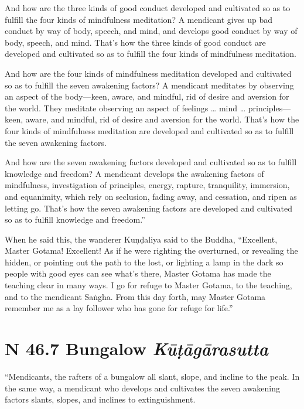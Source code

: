 \documentclass[12pt,openany]{book}%
\newcommand*{\suttatitleacronym}[1]{\smaller[2]{#1}\vspace*{.3em}}
\newcommand*{\suttatitletranslation}[1]{\linebreak{#1}}
\newcommand*{\suttatitleroot}[1]{\linebreak\smaller[2]\itshape{#1}}
\newcommand*{\tocacronym}[1]{\hspace*{-3.3em}{#1}\quad}
\newcommand*{\toctranslation}[1]{#1}
\newcommand*{\tocroot}[1]{(\textit{#1})}
\begin{document}
And how are the three kinds of good conduct developed and cultivated so as to fulfill the four kinds of mindfulness meditation? A mendicant gives up bad conduct by way of body, speech, and mind, and develops good conduct by way of body, speech, and mind. That’s how the three kinds of good conduct are developed and cultivated so as to fulfill the four kinds of mindfulness meditation. 

And how are the four kinds of mindfulness meditation developed and cultivated so as to fulfill the seven awakening factors? A mendicant meditates by observing an aspect of the body—keen, aware, and mindful, rid of desire and aversion for the world. They meditate observing an aspect of feelings … mind … principles—keen, aware, and mindful, rid of desire and aversion for the world. That’s how the four kinds of mindfulness meditation are developed and cultivated so as to fulfill the seven awakening factors. 

And how are the seven awakening factors developed and cultivated so as to fulfill knowledge and freedom? A mendicant develops the awakening factors of mindfulness, investigation of principles, energy, rapture, tranquility, immersion, and equanimity, which rely on seclusion, fading away, and cessation, and ripen as letting go. That’s how the seven awakening factors are developed and cultivated so as to fulfill knowledge and freedom.” 

When he said this, the wanderer \textsanskrit{Kuṇḍaliya} said to the Buddha, “Excellent, Master Gotama! Excellent! As if he were righting the overturned, or revealing the hidden, or pointing out the path to the lost, or lighting a lamp in the dark so people with good eyes can see what’s there, Master Gotama has made the teaching clear in many ways. I go for refuge to Master Gotama, to the teaching, and to the mendicant \textsanskrit{Saṅgha}. From this day forth, may Master Gotama remember me as a lay follower who has gone for refuge for life.” 

%
\section*{{\suttatitleacronym SN 46.7}{\suttatitletranslation A Bungalow }{\suttatitleroot Kūṭāgārasutta}}
\addcontentsline{toc}{section}{\tocacronym{SN 46.7} \toctranslation{A Bungalow } \tocroot{Kūṭāgārasutta}}

“Mendicants, the rafters of a bungalow all slant, slope, and incline to the peak. In the same way, a mendicant who develops and cultivates the seven awakening factors slants, slopes, and inclines to extinguishment. 
\end{document}
